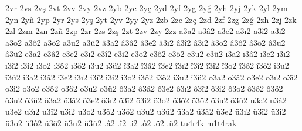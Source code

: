 {2vr
2vs
2vş
2vt
2vv
2vy
2vz
2yb
2yc
2yç
2yd
2yf
2yg
2yğ
2yh
2yj
2yk
2yl
2ym
2yn
2yñ
2yp
2yr
2ys
2yş
2yt
2yv
2yy
2yz
2zb
2zc
2zç
2zd
2zf
2zg
2zğ
2zh
2zj
2zk
2zl
2zm
2zn
2zñ
2zp
2zr
2zs
2zş
2zt
2zv
2zy
2zz
a3a2
a3â2
a3e2
a3ı2
a3î2
a3i2
a3o2
a3ô2
a3ö2
a3u2
a3ü2
â3a2
â3â2
â3e2
â3ı2
â3î2
â3i2
â3o2
â3ô2
â3ö2
â3u2
â3ü2
e3a2
e3â2
e3e2
e3ı2
e3î2
e3i2
e3o2
e3ô2
e3ö2
e3u2
e3ü2
ı3a2
ı3â2
ı3e2
ı3ı2
ı3î2
ı3i2
ı3o2
ı3ô2
ı3ö2
ı3u2
ı3ü2
î3a2
î3â2
î3e2
î3ı2
î3î2
î3i2
î3o2
î3ô2
î3ö2
î3u2
î3ü2
i3a2
i3â2
i3e2
i3ı2
i3î2
i3i2
i3o2
i3ô2
i3ö2
i3u2
i3ü2
o3a2
o3â2
o3e2
o3ı2
o3î2
o3i2
o3o2
o3ô2
o3ö2
o3u2
o3ü2
ô3a2
ô3â2
ô3e2
ô3ı2
ô3î2
ô3i2
ô3o2
ô3ô2
ô3ö2
ô3u2
ô3ü2
ö3a2
ö3â2
ö3e2
ö3ı2
ö3î2
ö3i2
ö3o2
ö3ô2
ö3ö2
ö3u2
ö3ü2
u3a2
u3â2
u3e2
u3ı2
u3î2
u3i2
u3o2
u3ô2
u3ö2
u3u2
u3ü2
ü3a2
ü3â2
ü3e2
ü3ı2
ü3î2
ü3i2
ü3o2
ü3ô2
ü3ö2
ü3u2
ü3ü2
.â2
.î2
.i2
.ô2
.ö2
.ü2
tu4r4k
m1t4rak
}
